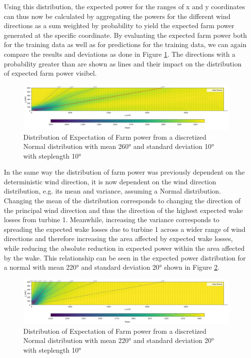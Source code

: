 Using this distribution, the expected power for the ranges of x and y coordinates can thus now be calculated by aggregating the powers for the different wind directions as a sum weighted by probability to yield the expected farm power generated at the specific coordinate. By evaluating the expected farm power both for the training data as well as for predictions for the training data, we can again compare the results and deviations as done in Figure \ref{fig:prob_expectation}. The directions with a probability greater than are shown as lines and their impact on the distribution of expected farm power visibel.

\begin{figure}[h] 
	\centering
	\includegraphics[width=1\textwidth]{figures/optimization/prob_expectation.png} 
	\caption{Distribution of Expectation of Farm power from a discretized Normal distribution with mean 260° and standard deviation 10° with steplength 10°}
	\label{fig:prob_expectation}
\end{figure}

In the same way the distribution of farm power was previously dependent on the deterministic wind direction, it is now dependent on the wind direction distribution, e.g. its mean and variance, assuming a Normal distribution. Changing the mean of the distribution corresponds to changing the direction of the principal wind direction and thus the direction of the highest expected wake losses from turbine 1. Meanwhile, increasing the variance corresponds to spreading the expected wake losses due to turbine 1 across a wider range of wind directions and therefore increasing the area affected by expected wake losses, while reducing the absolute reduction in expected power within the area affected by the wake. This relationship can be seen in the expected power distribution for a normal with mean 220° and standard deviation 20° shown in Figure \ref{fig:wind_dist_opti2}.


\begin{figure}[h] 
	\centering
	\includegraphics[width=1\textwidth]{figures/optimization/prob_expectation2.png} 
	\caption{Distribution of Expectation of Farm power from a discretized Normal distribution with mean 220° and standard deviation 20° with steplength 10°}
	\label{fig:wind_dist_opti2}
\end{figure}


